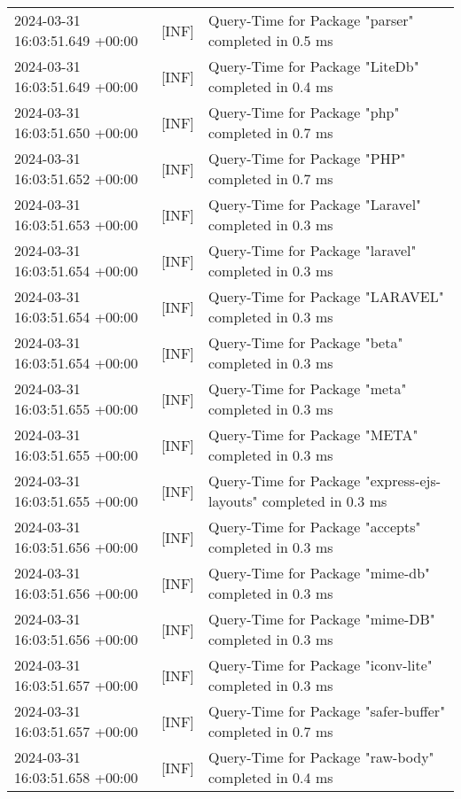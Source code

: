 {{\begin{tabularx}{\textwidth}{|l|l|X|}
                    2024-03-31 16:03:51.649 +00:00 & [INF] & Query-Time for Package "parser" completed in 0.5 ms \\
                    2024-03-31 16:03:51.649 +00:00 & [INF] & Query-Time for Package "LiteDb" completed in 0.4 ms \\
                    2024-03-31 16:03:51.650 +00:00 & [INF] & Query-Time for Package "php" completed in 0.7 ms \\
                    2024-03-31 16:03:51.652 +00:00 & [INF] & Query-Time for Package "PHP" completed in 0.7 ms \\
                    2024-03-31 16:03:51.653 +00:00 & [INF] & Query-Time for Package "Laravel" completed in 0.3 ms \\
                    2024-03-31 16:03:51.654 +00:00 & [INF] & Query-Time for Package "laravel" completed in 0.3 ms \\
                    2024-03-31 16:03:51.654 +00:00 & [INF] & Query-Time for Package "LARAVEL" completed in 0.3 ms \\
                    2024-03-31 16:03:51.654 +00:00 & [INF] & Query-Time for Package "beta" completed in 0.3 ms \\
                    2024-03-31 16:03:51.655 +00:00 & [INF] & Query-Time for Package "meta" completed in 0.3 ms \\
                    2024-03-31 16:03:51.655 +00:00 & [INF] & Query-Time for Package "META" completed in 0.3 ms \\
                    2024-03-31 16:03:51.655 +00:00 & [INF] & Query-Time for Package "express-ejs-layouts" completed in 0.3 ms \\
                    2024-03-31 16:03:51.656 +00:00 & [INF] & Query-Time for Package "accepts" completed in 0.3 ms \\
                    2024-03-31 16:03:51.656 +00:00 & [INF] & Query-Time for Package "mime-db" completed in 0.3 ms \\
                    2024-03-31 16:03:51.656 +00:00 & [INF] & Query-Time for Package "mime-DB" completed in 0.3 ms \\
                    2024-03-31 16:03:51.657 +00:00 & [INF] & Query-Time for Package "iconv-lite" completed in 0.3 ms \\
                    2024-03-31 16:03:51.657 +00:00 & [INF] & Query-Time for Package "safer-buffer" completed in 0.7 ms \\
                    2024-03-31 16:03:51.658 +00:00 & [INF] & Query-Time for Package "raw-body" completed in 0.4 ms \\

\end{tabularx}}}

